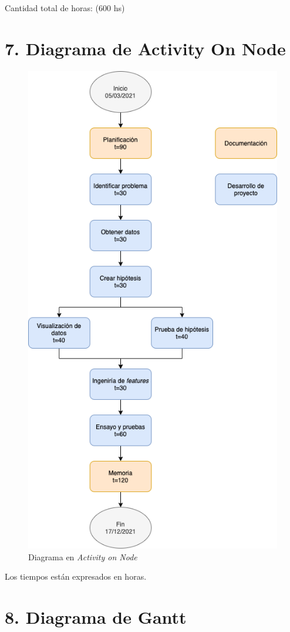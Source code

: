 \documentclass[11pt]{charter}
\begin{document}
Cantidad total de horas: (600 hs)

\section{7. Diagrama de Activity On Node}
\label{sec:AoN}

\begin{figure}[htpb]
\centering 
\includegraphics[width=.78\textwidth]{./Figuras/activity_on_node.png}
\caption{Diagrama en \textit{Activity on Node}}
\label{fig:AoN}
\end{figure}

Los tiempos están expresados en horas.

\section{8. Diagrama de Gantt}
\label{sec:gantt}
\end{document}
